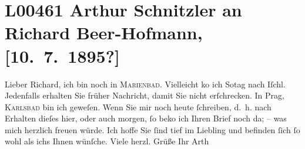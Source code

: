 

\section[Arthur Schnitzler an Richard Beer-Hofmann, {[}10. 7. 1895?{]}]{L00461 Arthur Schnitzler an Richard Beer-Hofmann, {[}10. 7. 1895?{]}}
\nopagebreak{}
\rehead{ }\normalsize\beginnumbering{}
\toendnotes[C]{\smallbreak\pagebreak[2]}
\pstart
           \noindent{}{\pb}Lieber Richard, ich bin noch in \textsc{Marienbad}. Vielleicht ko{\geminationm} ich So{\geminationn}tag nach Iſchl. Jedenfalls erhalten Sie früher Nachricht, damit Sie nicht
               erſchrecken. In Prag, \textsc{Karlsbad} bin ich geweſen. Wenn Sie mir {\pb}noch heute
               ſchreiben, d. h. nach Erhalten dieſes hier, oder auch morgen, ſo beko{\geminationm} ich Ihren Brief noch da; – was mich herzlich freuen
               würde. Ich hoffe Sie ſind tief im Liebling und
               befinden ſich ſo wohl als ichs Ihnen wünſche.\pend
           \pstart Viele herzl. Grüße Ihr \spacefill\mbox{Arth}\pend{}\endnumbering{}  
      